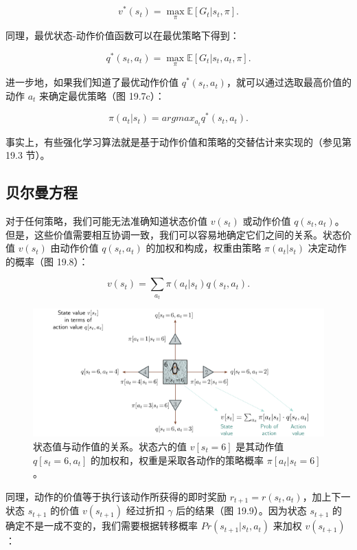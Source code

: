 \begin{equation}
v^*(s_t) = \max_{\pi} \mathbb{E} [ G_t|s_t, \pi ].  
\end{equation}

同理，最优状态-动作价值函数可以在最优策略下得到：

\begin{equation}
q^*(s_t, a_t) = \max_{\pi} \mathbb{E} [ G_t|s_t, a_t, \pi ]. 
\end{equation}

进一步地，如果我们知道了最优动作价值 \(q^*(s_t, a_t)\)，就可以通过选取最高价值的动作 \(a_t\) 来确定最优策略（图 19.7c）：

\begin{equation}
\pi(a_t|s_t) = argmax_{a_t} q^*(s_t, a_t). 
\end{equation}

事实上，有些强化学习算法就是基于动作价值和策略的交替估计来实现的（参见第 19.3 节）。

\subsection{贝尔曼方程}
对于任何策略，我们可能无法准确知道状态价值 \(v(s_t)\) 或动作价值 \(q(s_t, a_t)\)。但是，这些价值需要相互协调一致，我们可以容易地确定它们之间的关系。状态价值 \(v(s_t)\) 由动作价值 \(q(s_t, a_t)\) 的加权和构成，权重由策略 \(\pi(a_t|s_t)\) 决定动作的概率（图 19.8）：

\begin{equation}
v(s_t) = \sum_{a_t} \pi(a_t|s_t)q(s_t, a_t). 
\end{equation}

\begin{figure}[ht!]
\centering
\includegraphics[width=0.7\linewidth]{png/chapter19/ReinforceBellman3.png}
\caption{状态值与动作值的关系。状态六的值 \(v[s_t =6]\) 是其动作值 \(q[s_t =6,a_t]\) 的加权和，权重是采取各动作的策略概率 \(\pi[a_t|s_t =6]\)。}
\end{figure}

同理，动作的价值等于执行该动作所获得的即时奖励 \(r_{t+1} = r(s_t, a_t)\)，加上下一状态 \(s_{t+1}\) 的价值 \(v(s_{t+1})\) 经过折扣 \(\gamma\) 后的结果（图 19.9）。因为状态 \(s_{t+1}\) 的确定不是一成不变的，我们需要根据转移概率 \(Pr(s_{t+1}|s_t, a_t)\) 来加权 \(v(s_{t+1})\)：

